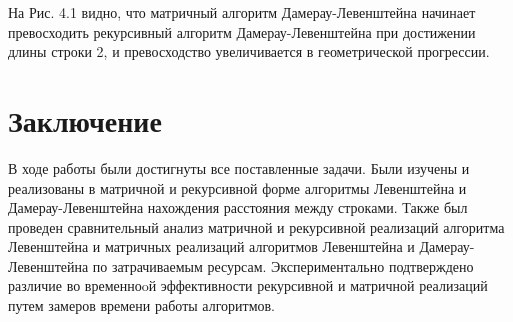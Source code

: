\documentclass[a4paper,12pt]{report}
\begin{document}
На Рис. 4.1 видно, что матричный алгоритм Дамерау-Левенштейна начинает превосходить рекурсивный алгоритм Дамерау-Левенштейна при достижении длины строки 2, и превосходство увеличивается в геометрической прогрессии.

\chapter*{Заключение}
\hspace{0.6cm}В ходе работы были достигнуты все поставленные задачи. Были изучены и реализованы в матричной и рекурсивной форме алгоритмы Левенштейна и Дамерау-Левенштейна нахождения расстояния между строками. Также был проведен сравнительный анализ матричной и рекурсивной реализаций алгоритма Левенштейна и матричных реализаций алгоритмов Левенштейна и Дамерау-Левенштейна по затрачиваемым ресурсам. Экспериментально подтверждено различие во временноoй эффективности рекурсивной и матричной реализаций путем замеров времени работы алгоритмов.
    
\end{document}
